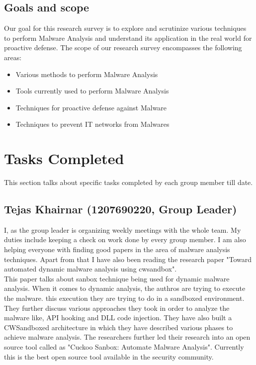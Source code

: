 \documentclass[16pt]{article}
\begin{document}
	\subsection{Goals and scope}
	Our goal for this research survey is to explore and scrutinize various techniques to perform Malware Analysis and understand its application in the real world for proactive defense.
	The scope of our research survey encompasses the following areas:
	\begin{itemize}
		\item{Various methods to perform Malware Analysis}
		\item{Tools currently used to perform Malware Analysis} 
		\item{Techniques for proactive defense against Malware}
		\item{Techniques to prevent IT networks from Malwares}
	\end{itemize}
	
	\section{Tasks Completed}
	This section talks about specific tasks completed by each group member till date.
		\subsection{Tejas Khairnar (1207690220, Group Leader)}
		I, as the group leader is organizing weekly meetings with the whole team. My duties include keeping a check on work done by every group member.
		I am also helping everyone with finding good papers in the area of malware analysis techniques. Apart from that I have also been reading the research paper "Toward automated dynamic malware analysis using cwsandbox". \\
		
		This paper talks about sanbox technique being used for dynamic malware analysis. When it comes to dynamic analysis, the authros are trying to execute the malware. this execution they are trying to do in a sandboxed environment. They further discuss various approaches they took in order to analyze the malware like, API hooking and DLL code injection. They have also built a CWSandboxed architecture in which they have described various phases to achieve malware analysis. The researchers further led their research into an open source tool called as "Cuckoo Sanbox: Automate Malware Analysis". Currently this is the best open source tool available in the security community.\\
\end{document}
